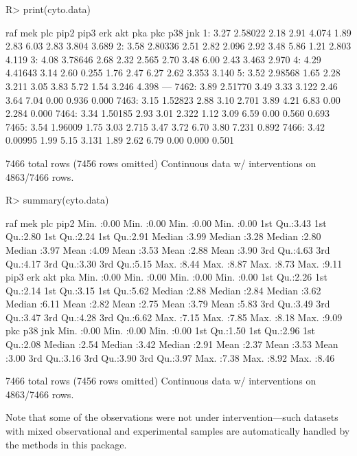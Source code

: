 \documentclass[article]{jss}
\renewcommand{\|}{\,|\,}
\begin{document}
%
\begin{CodeChunk}
\begin{CodeInput}
R> print(cyto.data)
\end{CodeInput}
\begin{CodeOutput}                          
       raf     mek  plc pip2  pip3  erk  akt  pka  pkc   p38   jnk
   1: 3.27 2.58022 2.18 2.91 4.074 1.89 2.83 6.03 2.83 3.804 3.689
   2: 3.58 2.80336 2.51 2.82 2.096 2.92 3.48 5.86 1.21 2.803 4.119
   3: 4.08 3.78646 2.68 2.32 2.565 2.70 3.48 6.00 2.43 3.463 2.970
   4: 4.29 4.41643 3.14 2.60 0.255 1.76 2.47 6.27 2.62 3.353 3.140
   5: 3.52 2.98568 1.65 2.28 3.211 3.05 3.83 5.72 1.54 3.246 4.398
  ---                                                             
7462: 3.89 2.51770 3.49 3.33 3.122 2.46 3.64 7.04 0.00 0.936 0.000
7463: 3.15 1.52823 2.88 3.10 2.701 3.89 4.21 6.83 0.00 2.284 0.000
7464: 3.34 1.50185 2.93 3.01 2.322 1.12 3.09 6.59 0.00 0.560 0.693
7465: 3.54 1.96009 1.75 3.03 2.715 3.47 3.72 6.70 3.80 7.231 0.892
7466: 3.42 0.00995 1.99 5.15 3.131 1.89 2.62 6.79 0.00 0.000 0.501

7466 total rows (7456 rows omitted)
Continuous data w/ interventions on 4863/7466 rows.
\end{CodeOutput}
\begin{CodeInput}
R> summary(cyto.data)
\end{CodeInput}
\begin{CodeOutput}                          
      raf            mek            plc            pip2     
 Min.   :0.00   Min.   :0.00   Min.   :0.00   Min.   :0.00  
 1st Qu.:3.43   1st Qu.:2.80   1st Qu.:2.24   1st Qu.:2.91  
 Median :3.99   Median :3.28   Median :2.80   Median :3.97  
 Mean   :4.09   Mean   :3.53   Mean   :2.88   Mean   :3.90  
 3rd Qu.:4.63   3rd Qu.:4.17   3rd Qu.:3.30   3rd Qu.:5.15  
 Max.   :8.44   Max.   :8.87   Max.   :8.73   Max.   :9.11  
      pip3           erk            akt            pka      
 Min.   :0.00   Min.   :0.00   Min.   :0.00   Min.   :0.00  
 1st Qu.:2.26   1st Qu.:2.14   1st Qu.:3.15   1st Qu.:5.62  
 Median :2.88   Median :2.84   Median :3.62   Median :6.11  
 Mean   :2.82   Mean   :2.75   Mean   :3.79   Mean   :5.83  
 3rd Qu.:3.49   3rd Qu.:3.47   3rd Qu.:4.28   3rd Qu.:6.62  
 Max.   :7.15   Max.   :7.85   Max.   :8.18   Max.   :9.09  
      pkc            p38            jnk      
 Min.   :0.00   Min.   :0.00   Min.   :0.00  
 1st Qu.:1.50   1st Qu.:2.96   1st Qu.:2.08  
 Median :2.54   Median :3.42   Median :2.91  
 Mean   :2.37   Mean   :3.53   Mean   :3.00  
 3rd Qu.:3.16   3rd Qu.:3.90   3rd Qu.:3.97  
 Max.   :7.38   Max.   :8.92   Max.   :8.46  

7466 total rows (7456 rows omitted)
Continuous data w/ interventions on 4863/7466 rows.
\end{CodeOutput}
\end{CodeChunk}
%
Note that some of the observations were not under intervention---such datasets with mixed observational and experimental samples are automatically handled by the methods in this package.
\end{document}
